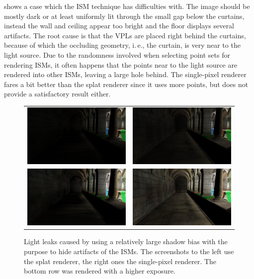  shows a case which the ISM technique has difficulties with. The image should be mostly dark or at least uniformly lit through the small gap below the curtains, instead the wall and ceiling appear too bright and the floor displays several artifacts. The root cause is that the VPLs are placed right behind the curtains, because of which the occluding geometry, i.\,e., the curtain, is very near to the light source. Due to the randomness involved when selecting point sets for rendering ISMs, it often happens that the points near to the light source are rendered into other ISMs, leaving a large hole behind. The single-pixel renderer fares a bit better than the splat renderer since it uses more points, but does not provide a satisfactory result either.



\begin{figure}[htb]
\centering
  \begin{tabular}{@{}cc@{}}
    \includegraphics[width=.48\textwidth]{screenshots/bias_splat} &
    \includegraphics[width=.48\textwidth]{screenshots/bias_single_pixel}\\
      \includegraphics[width=.48\textwidth]{screenshots/bias_splat_exposure} &
      \includegraphics[width=.48\textwidth]{screenshots/bias_single_pixel_exposure}
  \end{tabular}
  \caption{Light leaks caused by using a relatively large shadow bias with the purpose to hide artifacts of the ISMs. The screenshots to the left use the splat renderer, the right ones the single-pixel renderer. The bottom row was rendered with a higher exposure.}
  \label{fig:results:bias}
\end{figure}

